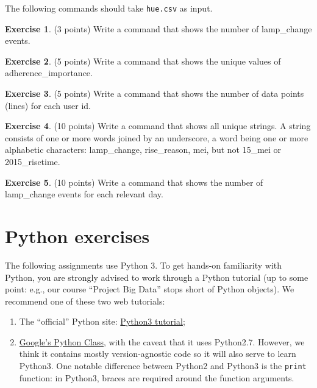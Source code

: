 \documentclass[a4paper]{report}
\theoremstyle{definition}
\newtheorem{exercise}{Exercise}
\begin{document}
	\noindent The following commands should take \texttt{hue.csv} as input.
	
	\begin{exercise}
		(3 points) Write a command that shows the number of lamp\_change events.
	\end{exercise}
	
	\begin{exercise}
		(5 points) Write a command that shows the unique values of adherence\_importance.
	\end{exercise}
	
	\begin{exercise}
		(5 points) Write a command that shows the number of data points (lines) for each
		user id.
	\end{exercise}
	
	\begin{exercise}
		(10 points) Write a command that shows all unique strings. A string consists of one or more words joined by an underscore, a word being
		one or more alphabetic characters: lamp\_change, rise\_reason, mei, but not 15\_mei or 2015\_risetime.
	\end{exercise}
	
	\begin{exercise}
		(10 points) Write a command that shows the number of lamp\_change events for each relevant day.
	\end{exercise}
	
	
	\section*{Python exercises}
	\label{python-exercises}
	The following assignments use Python 3. To get hands-on familiarity with
	Python, you are strongly advised to work through a Python tutorial (up to
	some point: e.g., our course ``Project Big Data'' stops short of Python objects). We recommend one of these two web tutorials:
	\begin{enumerate}
		\setlength\itemsep{1mm}
		\item The ``official'' Python site: \href{https://docs.python.org/3/tutorial}{Python3 tutorial};
		\item \href{https://developers.google.com/edu/python/}{Google's Python Class}, with the caveat that it uses Python2.7. However, we think it contains	mostly version-agnostic code so it will also serve to learn Python3.
		One notable difference between Python2 and Python3 is the
		{\small\texttt{print}} function: in Python3, braces are required around
		the function arguments.
	\end{enumerate}
	
\end{document}
